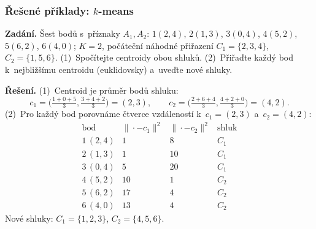 \subsubsection*{Řešené příklady: $k$-means}

\begin{priklad}
\par
\textbf{Zadání.} Šest bodů s~příznaky $A_1,A_2$: $1(2,4)$, $2(1,3)$, $3(0,4)$, $4(5,2)$, $5(6,2)$, $6(4,0)$; $K=2$, počáteční náhodné přiřazení $C_1=\{2,3,4\}$, $C_2=\{1,5,6\}$. (1)~Spočítejte centroidy obou shluků. (2)~Přiřaďte každý bod k~nejbližšímu centroidu (euklidovsky) a~uveďte nové shluky.

\smallskip
\textbf{Řešení.} (1)~Centroid je průměr bodů shluku:
\[ c_1=\Big(\tfrac{1+0+5}{3},\tfrac{3+4+2}{3}\Big)=(2,3),\qquad c_2=\Big(\tfrac{2+6+4}{3},\tfrac{4+2+0}{3}\Big)=(4,2). \]
(2)~Pro každý bod porovnáme čtverce vzdáleností k~$c_1=(2,3)$ a~$c_2=(4,2)$:
\[
\begin{array}{c|cc|c}
\text{bod} & \|{\cdot}-c_1\|^2 & \|{\cdot}-c_2\|^2 & \text{shluk}\\\hline
1\,(2,4) & 1  & 8  & C_1\\
2\,(1,3) & 1  & 10 & C_1\\
3\,(0,4) & 5  & 20 & C_1\\
4\,(5,2) & 10 & 1  & C_2\\
5\,(6,2) & 17 & 4  & C_2\\
6\,(4,0) & 13 & 4  & C_2
\end{array}
\]
Nové shluky: $C_1=\{1,2,3\}$, $C_2=\{4,5,6\}$.
\end{priklad}

